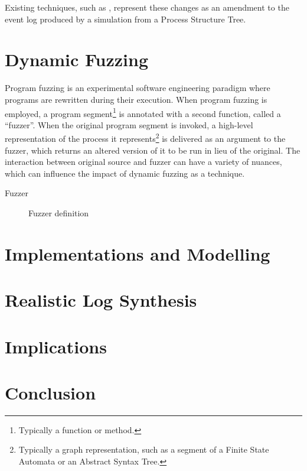 \documentclass[12pt,draft]{article}
\begin{document}
Existing techniques, such as , represent these changes as an
amendment to the event log produced by a simulation from a Process Structure
Tree. \par




\section{Dynamic Fuzzing}\label{sec:dynamic-fuzzing}

Program fuzzing is an experimental software engineering paradigm where programs
are rewritten during their execution. When program fuzzing is employed, a
program segment\footnote{Typically a function or method.} is annotated with a
second function, called a ``fuzzer''. When the original program segment is
invoked, a high-level representation of the process it
represents\footnote{Typically a graph representation, such as a segment of a
  Finite State Automata or an Abstract Syntax Tree.} is delivered
as an argument to the fuzzer, which returns an altered version of it to be run
in lieu of the original. The interaction between original source and fuzzer can
have a variety of nuances, which can influence the impact of dynamic fuzzing as
a technique.

\begin{description}
  \item[Fuzzer] Fuzzer definition
  \item[]
  
\end{description}


\section{Implementations and Modelling}
\label{sec:implementations-and-modelling}



\section{Realistic Log Synthesis}\label{sec:evaluation}



\section{Implications}\label{sec:implications}




\section{Conclusion}\label{sec:conclusion}
\end{document}
